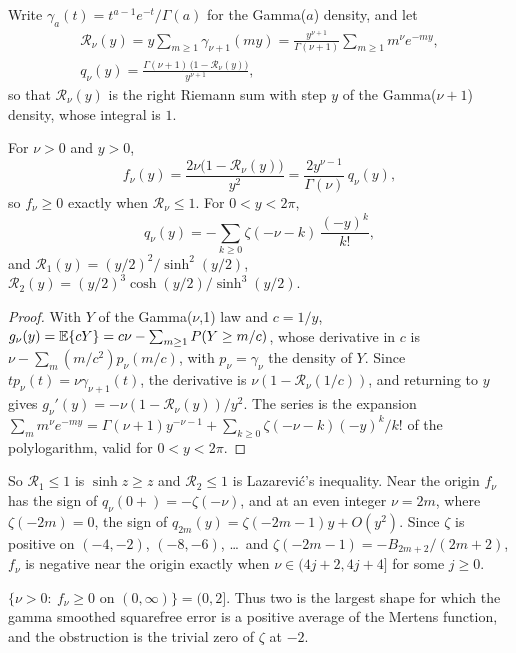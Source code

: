 Write $\gamma_a(t)=t^{a-1}e^{-t}/\Gamma(a)$ for the Gamma($a$) density, and let
\begin{gather*}
\mathcal R_\nu(y)=y\sum_{m\ge1}\gamma_{\nu+1}(my)=\frac{y^{\nu+1}}{\Gamma(\nu+1)}\sum_{m\ge1}m^\nu e^{-my},\\
q_\nu(y)=\frac{\Gamma(\nu+1)\,\big(1-\mathcal R_\nu(y)\big)}{y^{\nu+1}},
\end{gather*}
so that $\mathcal R_\nu(y)$ is the right Riemann sum with step $y$ of the Gamma($\nu+1$) density, whose integral is $1$.

\begin{lemma}\label{lem:sqfree:riemann}
For $\nu>0$ and $y>0$,
\[
f_\nu(y)=\frac{2\nu\big(1-\mathcal R_\nu(y)\big)}{y^2}=\frac{2y^{\nu-1}}{\Gamma(\nu)}\,q_\nu(y),
\]
so $f_\nu\ge0$ exactly when $\mathcal R_\nu\le1$. For $0<y<2\pi$,
\[
q_\nu(y)=-\sum_{k\ge0}\zeta(-\nu-k)\,\frac{(-y)^k}{k!},
\]
and $\mathcal R_1(y)=(y/2)^2/\sinh^2(y/2)$, $\mathcal R_2(y)=(y/2)^3\cosh(y/2)/\sinh^3(y/2)$.
\end{lemma}

\begin{proof}
With $Y$ of the Gamma($\nu$,1) law and $c=1/y$, $g_\nu(y)=\mathbb{E}\{cY\}=c\nu-\sum_{m\ge1}P(Y\ge m/c)$, whose derivative in $c$ is $\nu-\sum_m(m/c^2)p_\nu(m/c)$, with $p_\nu=\gamma_\nu$ the density of $Y$. Since $tp_\nu(t)=\nu\gamma_{\nu+1}(t)$, the derivative is $\nu(1-\mathcal R_\nu(1/c))$, and returning to $y$ gives $g_\nu'(y)=-\nu(1-\mathcal R_\nu(y))/y^2$. The series is the expansion $\sum_mm^\nu e^{-my}=\Gamma(\nu+1)y^{-\nu-1}+\sum_{k\ge0}\zeta(-\nu-k)(-y)^k/k!$ of the polylogarithm, valid for $0<y<2\pi$.
\end{proof}

So $\mathcal R_1\le1$ is $\sinh z\ge z$ and $\mathcal R_2\le1$ is Lazarevi\'c's inequality. Near the origin $f_\nu$ has the sign of $q_\nu(0+)=-\zeta(-\nu)$, and at an even integer $\nu=2m$, where $\zeta(-2m)=0$, the sign of $q_{2m}(y)=\zeta(-2m-1)y+O(y^2)$. Since $\zeta$ is positive on $(-4,-2)$, $(-8,-6)$, \dots\ and $\zeta(-2m-1)=-B_{2m+2}/(2m+2)$, $f_\nu$ is negative near the origin exactly when $\nu\in(4j+2,4j+4]$ for some $j\ge0$.

\begin{theorem}\label{thm:sqfree:threshold}
$\{\nu>0:\ f_\nu\ge0\text{ on }(0,\infty)\}=(0,2]$. Thus two is the largest shape for which the gamma smoothed squarefree error is a positive average of the Mertens function, and the obstruction is the trivial zero of $\zeta$ at $-2$.
\end{theorem}


